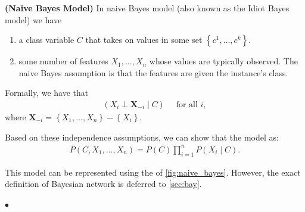 \documentclass{article}
\newcommand{\bfs}[1]{\textbf{({#1}) }}
\begin{document}
\begin{defa}\bfs{Naive Bayes Model}
 In naive Bayes model (also known as the Idiot Bayes model) we have
 \begin{enumerate}
     \item a class variable $C$ that takes on values in some set $\left\{c^{1}, \ldots, c^{k}\right\} .$
     \item some number of features $X_{1}, \ldots, X_{n}$ whose values are typically observed. The naive Bayes assumption is that the features are  given the instance's class.
 \end{enumerate} 
Formally, we have that
\begin{align*}
\left(X_{i} \perp \boldsymbol{X}_{-i} \mid C\right) \quad \text { for all } i,
\end{align*}
where $\boldsymbol{X}_{-i}=\left\{X_{1}, \ldots, X_{n}\right\}-\left\{X_{i}\right\} .$ 

Based on these independence assumptions, we can show that the model  as:
\begin{align*}
P\left(C, X_{1}, \ldots, X_{n}\right)=P(C) \prod_{i=1}^{n} P\left(X_{i} \mid C\right) .
\end{align*}
\end{defa}
\begin{rema}
This model can be represented using the  of \cref{fig:naive_bayes}. However, the exact definition of Bayesian network is deferred to \cref{sec:bay}.
\end{rema}


$\bullet$  
\end{document}
